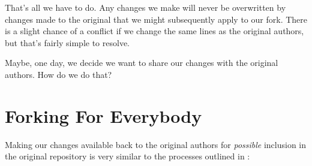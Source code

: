 That's all we have to do. Any changes we make will never be overwritten by changes made to the original that we might subsequently apply to our fork. There is a slight chance of a conflict if we change the same lines as the original authors, but that's fairly simple to resolve.

Maybe, one day, we decide we want to share our changes with the original authors. How do we do that?

\section{Forking For Everybody}\label{sect: Fork everyone}

Making our changes available back to the original authors for \emph{possible} inclusion in the original repository is very similar to the processes outlined in :

